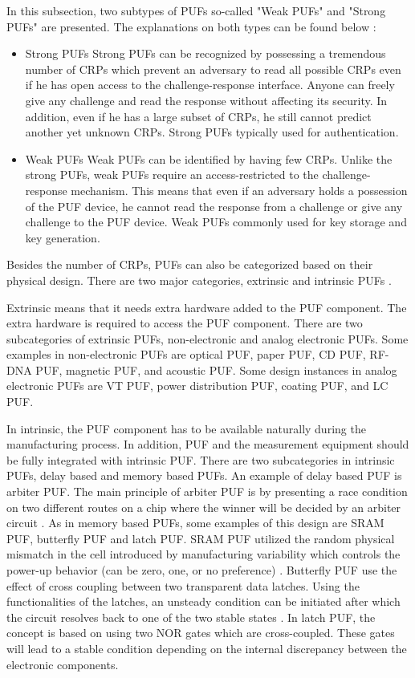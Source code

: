 In this subsection, two subtypes of PUFs so-called "Weak PUFs" and "Strong PUFs" are presented.  The explanations on both types can be found below \cite{6800561}:
\begin{itemize}
\item Strong PUFs\newline
Strong PUFs can be recognized by possessing a tremendous number of CRPs which prevent an adversary to read all possible CRPs even if he has open access to the challenge-response interface. Anyone can freely give any challenge and read the response without affecting its security. In addition, even if he has a large subset of CRPs, he still cannot predict another yet unknown CRPs. Strong PUFs typically used for authentication.
\item Weak PUFs\newline
Weak PUFs can be identified by having few CRPs. Unlike the strong PUFs, weak PUFs require an access-restricted to the challenge-response mechanism. This means that even if an adversary holds a possession of the PUF device, he cannot read the response from a challenge or give any challenge to the PUF device. Weak PUFs commonly used for key storage and key generation.
\end{itemize}

Besides the number of CRPs, PUFs can also be categorized based on their physical design. There are two major categories, extrinsic and intrinsic PUFs \cite{maes_2016}.

Extrinsic means that it needs extra hardware added to the PUF component. The extra hardware is required to access the PUF component. There are two subcategories of extrinsic PUFs, non-electronic and analog electronic PUFs. Some examples in non-electronic PUFs are optical PUF, paper PUF, CD PUF, RF-DNA PUF, magnetic PUF, and acoustic PUF. Some design instances in analog electronic PUFs are VT PUF, power distribution PUF, coating PUF, and LC PUF.

In intrinsic, the PUF component has to be available naturally during the manufacturing process. In addition, PUF and the measurement equipment should be fully integrated with intrinsic PUF. There are two subcategories in intrinsic PUFs, delay based and memory based PUFs. An example of delay based PUF is arbiter PUF. The main principle of arbiter PUF is by presenting a race condition on two different routes on a chip where the winner will be decided by an arbiter circuit \cite{study_of_the_art_puf}. As in memory based PUFs, some examples of this design are SRAM PUF, butterfly PUF and latch PUF. SRAM PUF utilized the random physical mismatch in the cell introduced by manufacturing variability which controls the power-up behavior (can be zero, one, or no preference) \cite{study_of_the_art_puf}. Butterfly PUF use the effect of cross coupling between two transparent data latches. Using the functionalities of the latches, an unsteady condition can be initiated after which the circuit resolves back to one of the two stable states \cite{study_of_the_art_puf}. In latch PUF, the concept is based on using two NOR gates which are cross-coupled. These gates will lead to a stable condition depending on the internal discrepancy between the electronic components.

